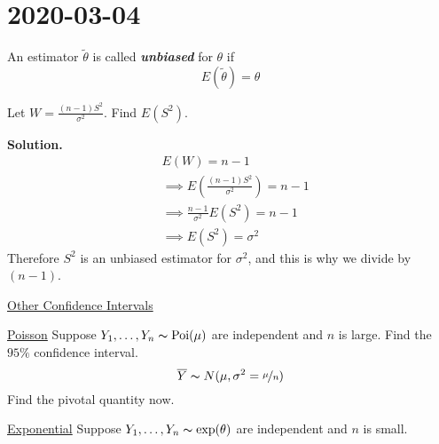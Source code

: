 \section{2020-03-04}
\begin{defbox}
    \begin{definition}
        An estimator $ \tilde{\theta} $ is called \textbf{\emph{unbiased}} for $ \theta $ if
        \[ E(\tilde{\theta})=\theta \]
    \end{definition}
\end{defbox}
\begin{exbox}
    \begin{example}
        Let $ W=\frac{(n-1)S^2}{\sigma^2} $. Find $ E(S^2) $.

        \textbf{Solution.}
        \begin{align*}
             & E(W)=n-1                                              \\
             & \implies E\left(\frac{(n-1)S^2}{\sigma^2} \right)=n-1 \\
             & \implies \frac{n-1}{\sigma^2} E(S^2)=n-1              \\
             & \implies E(S^2)=\sigma^2
        \end{align*}
        Therefore $ S^2 $ is an unbiased estimator for $ \sigma^2 $, and this is why
        we divide by $ (n-1) $.
    \end{example}
\end{exbox}

\underline{Other Confidence Intervals}

\underline{Poisson}
Suppose $ Y_1,\ldots ,Y_n \thicksim \operatorname{Poi}(\mu) $
are independent and $ n $ is large. Find the $ 95\% $ confidence interval.
\[ \overline{Y} \thicksim N(\mu,\sigma^2=\nicefrac{\mu}{n}) \]
Find the pivotal quantity now.

\underline{Exponential}
Suppose $ Y_1,\ldots ,Y_n \thicksim \exp(\theta) $ are independent and $ n $ is small.


